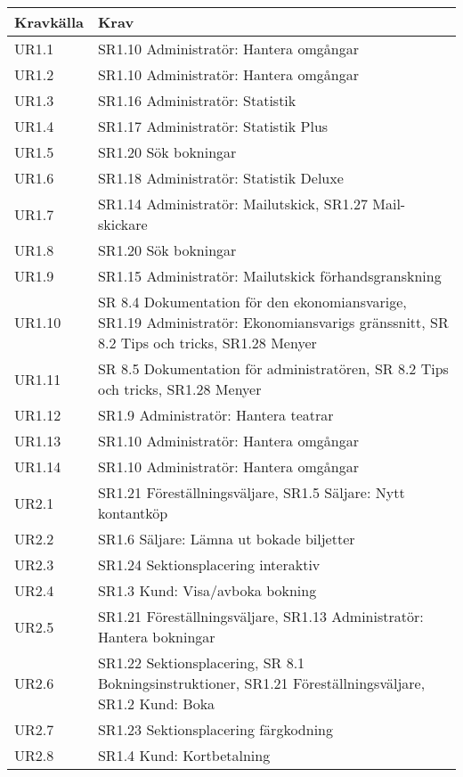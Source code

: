 \documentclass[a4paper, twoside, 11pt, titlepage]{article}
\begin{document}
\begin{tabular} { p{2.6cm} p{12.5cm} }
	\hline
	\sffamily\textbf{Kravkälla} & \sffamily\textbf{Krav } \\
	\hline
	UR1.1 & SR1.10 Administratör: Hantera omgångar  \\
	\hline
	UR1.2 & SR1.10 Administratör: Hantera omgångar  \\
	\hline
	UR1.3 & SR1.16 Administratör: Statistik  \\
	\hline
	UR1.4 & SR1.17 Administratör: Statistik Plus  \\
	\hline
	UR1.5 & SR1.20 Sök bokningar  \\
	\hline
	UR1.6 & SR1.18 Administratör: Statistik Deluxe  \\
	\hline
	UR1.7 & SR1.14 Administratör: Mailutskick, SR1.27 Mail-skickare  \\
	\hline
	UR1.8 & SR1.20 Sök bokningar  \\
	\hline
	UR1.9 & SR1.15 Administratör: Mailutskick förhandsgranskning  \\
	\hline
	UR1.10 & SR 8.4 Dokumentation för den ekonomiansvarige, SR1.19 Administratör: Ekonomiansvarigs gränssnitt, SR 8.2 Tips och tricks, SR1.28 Menyer  \\
	\hline
	UR1.11 & SR 8.5 Dokumentation för administratören, SR 8.2 Tips och tricks, SR1.28 Menyer  \\
	\hline
	UR1.12 & SR1.9 Administratör: Hantera teatrar  \\
	\hline
	UR1.13 & SR1.10 Administratör: Hantera omgångar  \\
	\hline
	UR1.14 & SR1.10 Administratör: Hantera omgångar  \\
	\hline
	UR2.1 & SR1.21 Föreställningsväljare, SR1.5 Säljare: Nytt kontantköp  \\
	\hline
	UR2.2 & SR1.6 Säljare: Lämna ut bokade biljetter  \\
	\hline
	UR2.3 & SR1.24 Sektionsplacering interaktiv  \\
	\hline
	UR2.4 & SR1.3 Kund: Visa/avboka bokning  \\
	\hline
	UR2.5 & SR1.21 Föreställningsväljare, SR1.13 Administratör: Hantera bokningar  \\
	\hline
	UR2.6 & SR1.22 Sektionsplacering, SR 8.1 Bokningsinstruktioner, SR1.21 Föreställningsväljare, SR1.2 Kund: Boka  \\
	\hline
	UR2.7 & SR1.23 Sektionsplacering färgkodning  \\
	\hline
	UR2.8 & SR1.4 Kund: Kortbetalning  \\

\end{tabular}
\end{document}
